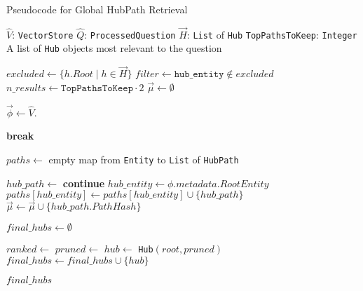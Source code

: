 \begin{algorithm}[t]
\caption{Pseudocode for Global HubPath Retrieval}
\label{alg:global_similarity_search}
\begin{algorithmic}[1]
\PersistentState
    \Statex $\hat{V}$: \texttt{VectorStore} 
\Require 
    \Statex $\hat{Q}$: \texttt{ProcessedQuestion} 
    \Statex $\vec{H}$: \texttt{List} of \texttt{Hub} 
    \Statex \texttt{TopPathsToKeep}: \texttt{Integer} 
\Ensure
    \Statex A list of \texttt{Hub} objects most relevant to the question

    \State $excluded \gets \{h.Root \mid h \in \vec{H}\}$ 
    \State $filter \gets \texttt{hub\_entity} \notin excluded$ 
    \State $n\_results \gets \texttt{TopPathsToKeep} \cdot 2$ 
    \State $\vec{\mu} \gets \emptyset$ 

        \State $\vec{\phi} \gets \hat{V}$.
    
        \If{$\vec{\phi} = \emptyset$}
            \State \textbf{break}
        \EndIf
        
        \State $paths \gets$ empty map from \texttt{Entity} to \texttt{List} of \texttt{HubPath}
        
        \ForAll{$\phi \in \vec{\phi}$}
            \State $hub\_path \gets$  
                \State \textbf{continue} 
            \EndIf
            \State $hub\_entity \gets \phi.metadata.RootEntity$
            \State $paths[hub\_entity] \gets paths[hub\_entity] \cup \{hub\_path\}$
            \State $\vec{\mu} \gets \vec{\mu} \cup \{hub\_path.PathHash\}$
        \EndFor
    \EndWhile
    
    \State $final\_hubs \gets \emptyset$

        \State $ranked \gets$ 
        \State $pruned \gets$ 
        \State $hub \gets$ \texttt{Hub}$(root, pruned)$
        \State $final\_hubs \gets final\_hubs \cup \{hub\}$
    \EndFor

    \State \Return $final\_hubs$ 

\EndFunction

\end{algorithmic}
\end{algorithm}

